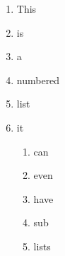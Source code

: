 \begin{enumerate}
    \item This
    \item is
    \item a
    \item numbered
    \item list
    \item it
    \begin{enumerate}
        \item can
        \item even
        \item have
        \item sub
        \item lists
    \end{enumerate}
\end{enumerate}